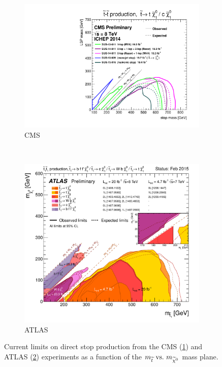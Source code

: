 \begin{figure}[h!]
  \centering
  \begin{subfigure}[b]{0.65\textwidth}
    \includegraphics[width=\textwidth]{Figs/other_limits/T2tt_ICHEP2014_All.pdf}
    \caption{CMS}
    \label{fig:cms_current_limit}
  \end{subfigure}\\
  \begin{subfigure}[b]{0.65\textwidth}
    \includegraphics[width=\textwidth]{Figs/other_limits/ATLAS_SUSY_Stop_tLSP.pdf}
    \caption{ATLAS}
    \label{fig:atlas_current_limit}
  \end{subfigure}
  \caption{Current limits on direct stop production from the CMS
  (\ref{fig:cms_current_limit})\cite{cmssusyresults} and ATLAS
  (\ref{fig:atlas_current_limit})\cite{atlassusyresults}
  experiments as a function of the $m_{\widetilde{t}} \text{ vs.\ } m_{\widetilde{\chi}^{0}}$ mass
  plane.}
  \label{fig:current_limits}
\end{figure}


